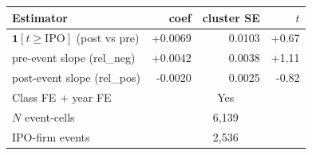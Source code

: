\begin{tabular}{lrrr}
\toprule
Estimator & coef & cluster SE & $t$ \\
\midrule
  $\mathbf{1}[t \geq \text{IPO}]$ (post vs pre) & +0.0069 & 0.0103 & +0.67 \\
  pre-event slope (rel\_neg) & +0.0042 & 0.0038 & +1.11 \\
  post-event slope (rel\_pos) & -0.0020 & 0.0025 & -0.82 \\
\midrule
  Class FE + year FE & \multicolumn{3}{c}{Yes} \\
  $N$ event-cells & \multicolumn{3}{c}{6,139} \\
  IPO-firm events & \multicolumn{3}{c}{2,536} \\
\bottomrule
\end{tabular}